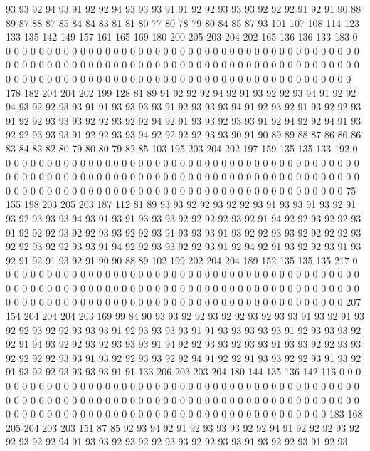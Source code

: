 93 93 92 94 93 91 92 92 94 93 93 93 91 91 92 92 93 93 93 92
92 92 91 92 91 90 88 89 87 88 87 85 84 84 83 81 81 80 77 80
78 79 80 84 85 87 93 101 107 108 114 123 133 135 142 149 157 161 165 169
180 200 205 203 204 202 165 136 136 133 183 0 0 0 0 0 0 0 0 0
0 0 0 0 0 0 0 0 0 0 0 0 0 0 0 0 0 0 0 0
0 0 0 0 0 0 0 0 0 0 0 0 0 0 0 0 0 0 0 0
0 0 0 0 0 0 0 0 0 0 0 0 0 0 0 0 0 0 0 0
0 0 0 0 0 0 0 0 0 0 0 0 0 0 0 0 0 0 0 0
0 0 0 0 0 0 0 0 0 0 0 0 0 0 0 0 0 0 0 0
0 0 0 0 0 0 0 0 0 0 0 0 0 0 0 0 0 0 0 0
178 182 204 204 202 199 128 81 89 91 92 92 92 94 92 91 93 92 92 93
94 91 92 92 94 93 92 92 93 93 91 91 93 93 93 93 91 92 93 93
93 94 91 92 93 92 91 93 92 92 93 91 92 92 93 93 93 92 92 93
92 92 94 92 91 93 93 92 93 93 91 92 94 92 92 94 91 93 92 92
93 93 93 91 92 92 93 93 94 92 92 92 92 93 93 90 91 90 89 89
88 87 86 86 86 83 84 82 82 80 79 80 80 79 82 85 103 195 203 204
202 197 159 135 135 133 192 0 0 0 0 0 0 0 0 0 0 0 0 0
0 0 0 0 0 0 0 0 0 0 0 0 0 0 0 0 0 0 0 0
0 0 0 0 0 0 0 0 0 0 0 0 0 0 0 0 0 0 0 0
0 0 0 0 0 0 0 0 0 0 0 0 0 0 0 0 0 0 0 0
0 0 0 0 0 0 0 0 0 0 0 0 0 0 0 0 0 0 0 0
0 0 0 0 0 0 0 0 0 0 0 0 0 0 0 0 0 0 0 0
0 0 0 0 0 0 0 0 0 0 0 0 0 0 0 75 155 198 203 205
203 187 112 81 89 93 93 92 92 93 92 92 93 91 93 93 91 93 92 91
93 92 93 93 93 94 93 91 93 91 93 93 93 92 92 92 92 93 92 91
94 92 92 93 92 92 93 91 92 92 92 93 92 92 93 93 92 92 93 91
93 93 93 91 93 92 92 93 93 92 92 92 92 93 92 92 93 92 92 93
93 91 94 92 92 93 93 92 92 93 91 92 94 92 91 93 92 92 93 91
93 92 91 92 91 93 92 91 90 90 88 89 102 199 202 204 204 189 152 135
135 135 217 0 0 0 0 0 0 0 0 0 0 0 0 0 0 0 0 0
0 0 0 0 0 0 0 0 0 0 0 0 0 0 0 0 0 0 0 0
0 0 0 0 0 0 0 0 0 0 0 0 0 0 0 0 0 0 0 0
0 0 0 0 0 0 0 0 0 0 0 0 0 0 0 0 0 0 0 0
0 0 0 0 0 0 0 0 0 0 0 0 0 0 0 0 0 0 0 0
0 0 0 0 0 0 0 0 0 0 0 0 0 0 0 0 0 0 0 0
0 0 0 0 0 0 0 0 0 0 0 207 154 204 204 204 203 169 99 84
90 93 93 92 92 93 92 92 93 92 93 93 91 93 92 91 93 92 92 93
92 92 93 93 93 91 92 93 93 93 93 91 91 93 93 93 93 93 91 92
93 93 93 92 92 91 94 93 92 92 93 92 93 93 93 91 94 92 92 93
93 92 93 93 91 93 93 92 92 93 93 92 92 92 92 93 93 91 93 92
92 93 93 92 92 94 91 92 92 91 93 93 92 92 93 91 93 92 91 93
92 92 93 93 93 93 91 91 133 206 203 203 204 180 144 135 136 142 116 0
0 0 0 0 0 0 0 0 0 0 0 0 0 0 0 0 0 0 0 0
0 0 0 0 0 0 0 0 0 0 0 0 0 0 0 0 0 0 0 0
0 0 0 0 0 0 0 0 0 0 0 0 0 0 0 0 0 0 0 0
0 0 0 0 0 0 0 0 0 0 0 0 0 0 0 0 0 0 0 0
0 0 0 0 0 0 0 0 0 0 0 0 0 0 0 0 0 0 0 0
0 0 0 0 0 0 0 0 0 0 0 0 0 0 0 0 0 0 0 0
0 0 0 0 0 0 0 183 168 205 204 203 203 151 87 85 92 93 94 92
91 92 93 93 93 92 92 94 91 92 92 92 93 92 92 93 92 92 94 91
93 93 92 93 92 92 93 93 92 92 93 93 91 93 92 92 93 91 92 93
